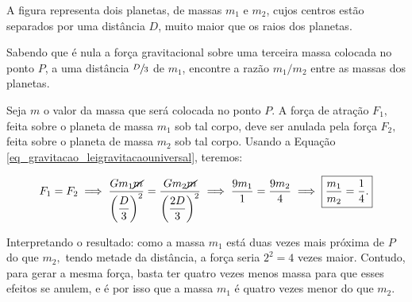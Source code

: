 \begin{exemplo}[Nível II]\label{exemplo_gravitacao_leigravitacaouniversalex02}


A figura representa dois planetas, de massas $m_1$ e $m_2$, cujos centros estão separados por uma distância $D$, muito maior que os raios dos planetas.

\begin{center}
\end{center}

Sabendo que é nula a força gravitacional sobre uma terceira massa colocada no ponto $P$, a uma distância $\sfrac{D}{3}$ de $m_1$, encontre a razão $m_1/m_2$ entre as massas dos planetas.



\resolucao

Seja $m$ o valor da massa que será colocada no ponto $P.$ A força de atração $F_1,$ feita sobre o planeta de massa $m_1$ sob tal corpo, deve ser anulada pela força $F_2,$ feita sobre o planeta de massa $m_2$ sob tal corpo. Usando a Equação \eqref{eq_gravitacao_leigravitacaouniversal}, teremos:

$$ F_1 = F_2 \implies \dfrac{Gm_1 \cancel m}{\left( \dfrac{D}{3} \right)^2} = \dfrac{Gm_2 \cancel m}{\left( \dfrac{2D}{3} \right)^2} \implies \dfrac{9m_1}{1} =  \dfrac{9m_2}{4} \implies \boxed{\dfrac{m_1}{m_2} = \dfrac{1}{4}.} $$

Interpretando o resultado: como a massa $m_1$ está duas vezes mais próxima de $P$ do que $m_2,$ tendo metade da distância, a força seria $2^2 = 4$ vezes maior. Contudo, para gerar a mesma força, basta ter quatro vezes menos massa para que esses efeitos se anulem, e é por isso que a massa $m_1$ é quatro vezes menor do que $m_2.$



\end{exemplo}



